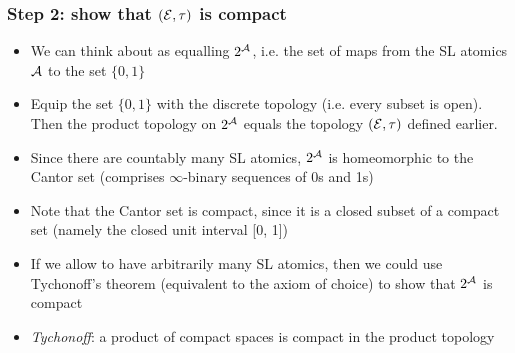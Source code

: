 \begin{frame}
\frametitle{Step 2: show that $(\mathcal{E}, \tau)$ is compact}

\begin{itemize}[<+->]

\item We can think about  as equalling $2^{\mathcal{A}}$, i.e. the set of maps from the SL atomics $\mathcal{A}$ to the set $\{0, 1\}$

\item Equip the set $\{0, 1\}$ with the discrete topology (i.e. every subset is open). Then the product topology on $2^{\mathcal{A}}$ equals the topology $(\mathcal{E}, \tau)$ defined earlier. 

\item Since there are countably many SL atomics, $2^{\mathcal{A}}$ is homeomorphic to the Cantor set (comprises $\infty$-binary sequences of 0s and 1s)



\item Note that the Cantor set is compact, since it is a closed subset of a compact set (namely the closed unit interval [0, 1])

\item If we allow  to have arbitrarily many SL atomics, then we could use Tychonoff's theorem (equivalent to the axiom of choice) to show that $2^{\mathcal{A}}$ is compact 

\item \textit{Tychonoff}: a product of compact spaces is compact in the product topology 

\end{itemize}
\end{frame}




























